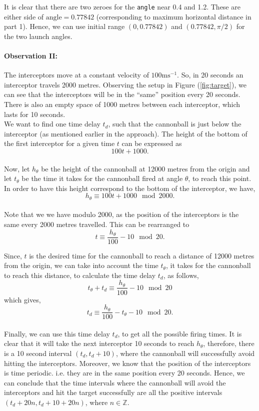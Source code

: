 \documentclass[11pt]{report}
\begin{document}
It is clear that there are two zeroes for the \texttt{angle} near 0.4 and 1.2. These are either side of $\text{angle}=0.77842$ (corresponding to maximum horizontal distance in part 1). Hence, we can use initial range $(0, 0.77842)$ and $(0.77842, \pi/2)$ for the two launch angles.

\paragraph{Observation II:} The interceptors move at a constant velocity of $100\text{ms}^{-1}$. So, in 20 seconds an interceptor travels 2000 metres. Observing the setup in Figure (\ref{fig:target}), we can see that the interceptors will be in the ``same'' position every 20 seconds. There is also an empty space of 1000 metres between each interceptor, which lasts for 10 seconds. \\

We want to find one time delay $t_d$, such that the cannonball is just below the interceptor (as mentioned earlier in the approach). The height of the bottom of the first interceptor for a given time $t$ can be expressed as $$ 100t + 1000. $$\\

Now, let $h_{\theta}$ be the height of the cannonball at 12000 metres from the origin and let $t_{\theta}$ be the time it takes for the cannonball fired at angle $\theta$, to reach this point. In order to have this height correspond to the bottom of the interceptor, we have, $$h_{\theta} \equiv 100t + 1000 \mod 2000.$$ \\

Note that we we have modulo 2000, as the position of the interceptors is the same every 2000 metres travelled. This can be rearranged to $$t \equiv \frac{h_{\theta}}{100} - 10 \mod 20.$$

Since, $t$ is the desired time for the cannonball to reach a distance of 12000 metres from the origin, we can take into account the time $t_{\theta}$, it takes for the cannonball to reach this distance, to calculate the time delay $t_d$, as follows, $$ t_{\theta} + t_d \equiv \frac{h_{\theta}}{100} - 10 \mod 20$$ which gives, 
\begin{equation}
	t_d \equiv \frac{h_{\theta}}{100} - t_{\theta} - 10 \mod 20.
	\label{eq:timedelay}
\end{equation} \\

Finally, we can use this time delay $t_d$, to get all the possible firing times. It is clear that it will take the next interceptor 10 seconds to reach $h_{\theta}$, therefore, there is a 10 second interval $(t_d, t_d + 10)$, where the cannonball will successfully avoid hitting the interceptors. Moreover, we know that the position of the interceptors is time periodic. i.e. they are in the same position every 20 seconds. Hence, we can conclude that the time intervals where the cannonball will avoid the interceptors and hit the target successfully are all the positive intervals $(t_d+20n, t_d+10+20n)$, where $n\in \mathbb{Z}$. 
\end{document}
